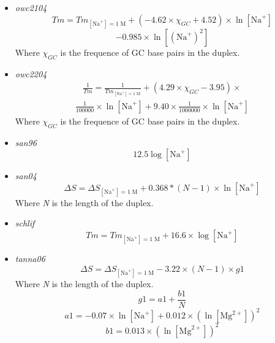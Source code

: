 \documentclass{article}
\begin{document}
\begin{itemize}
 \item \textit{owc2104}
 \begin{displaymath}
 Tm=Tm_{[\mbox{Na}^+]=1\;\mathrm{M}}+ (-4.62 \times \chi_{GC} + 4.52) \times \ln [\mbox{Na}^+] 
 \end{displaymath}
 \begin{displaymath}
 - 0.985 \times \ln [(\mbox{Na}^+)^2]  
 \end{displaymath}
 Where \emph{$\chi_{GC}$} is the frequence of GC base pairs in the duplex.
 \item \textit{owc2204}
 \begin{multline*}
 \frac{1}{Tm}=\frac{1}{Tm_{[\mbox{Na}^+]=1\;\mathrm{M}}}+ (4.29 \times \chi_{GC} - 3.95) \times 
 \end{multline*}
 \begin{multline*}
 \frac{1}{100000} \times \ln [\mbox{Na}^+] +
 9.40 \times \frac{1}{1000000} \times \ln [\mbox{Na}^+]
 \end{multline*}
 Where \emph{$\chi_{GC}$} is the frequence of GC base pairs in the duplex.
 \item \textit{san96}
 \begin{displaymath}
  12.5  \log [\mbox{Na}^+]   
 \end{displaymath}
 \item \textit{san04}
 \begin{displaymath}
  \Delta{}S=\Delta{}S_{[\mbox{Na}^+]=1\;\mathrm{M}}+ 0.368 * (N - 1) \times \ln [\mbox{Na}^+]   
 \end{displaymath}
 Where \emph{N} is the length of the duplex.
 \item \textit{schlif}
 \begin{displaymath}
  Tm=Tm_{[\mbox{Na}^+]=1\;\mathrm{M}}+ 16.6 \times \log [\mbox{Na}^+]   
 \end{displaymath}
 \item \textit{tanna06}
 \begin{displaymath}
  \Delta{}S=\Delta{}S_{[\mbox{Na}^+]=1\;\mathrm{M}}- 3.22 \times (N - 1) \times g1  
 \end{displaymath}
 Where \emph{N} is the length of the duplex.
 \begin{displaymath}
  g1=a1 + \frac{b1}{N}  
 \end{displaymath}
 \begin{displaymath}
  a1= -0.07 \times \ln [\mbox{Na}^+] + 0.012 \times (\ln [\mbox{Mg}^{2+}])^2  
 \end{displaymath}
 \begin{displaymath}
  b1= 0.013 \times (\ln [\mbox{Mg}^{2+}])^2  

\end{displaymath}
\end{itemize}
\end{document}
